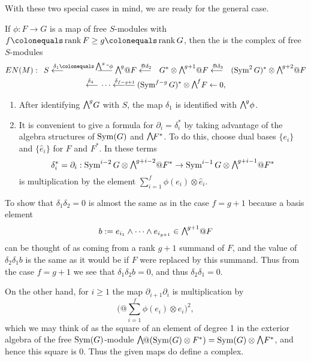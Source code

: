 With these two special cases in mind, we are ready for the general
case. 

\begin{definition}
If $\phi: F\to G$ is a map of free $S$-modules with 
$f\colonequals \rank F\geq  g\colonequals  \rank G$, then the
%
is the complex of free $S$-modules
\begin{multline*}
EN(M): \quad
S \luto{\delta_1\colonequals \ssty\bigwedge^g``\phi}\hskip-30pt-\hskip-4pt-\hskip-4pt-
\hskip3pt
\mwedge^g @F
\luto{@\delta_{2}}
G^*\otimes \mwedge^{g+1}@ F  \luto{@\delta_{3}}
(\Sym^2G)^*\otimes\mwedge^{g+2}@F  \\
\luto{\delta_{4}}\cdots\luto{\delta_{f-g+1}}\hskip-23pt-\hskip-4pt-
(\Sym^{f-g}G)^*\otimes\mwedge^fF
\leftarrow 0,
\end{multline*}
\begin{enumerate}

\item After identifying $\mwedge^{g}G$ with $S$, the map $\delta_{1}$
is identified with $\mwedge^{g}\phi$.

\item It is convenient to give a formula for $\partial_{i} =
\delta_{i}^{*}$ by taking advantage of the
algebra structures of $\operatorname{Sym}(G)$ and $\mwedge F^{*}$. To do this, choose
dual bases $\{e_{i}\}$ and $\{\hat e_{i}\}$ for $F$ and $F^{*}$. In
these terms
$$
\delta_{i}^{*} = \partial_{i}:
\Sym^{i-2}G \otimes \mwedge^{g+i-2}@F^{*} \to
\Sym^{i-1}G \otimes \mwedge^{g+i-1}@F^{*}
$$
is multiplication by the element
$\sum_{i = 1}^{f} \phi(e_{i}) \otimes \hat e_{i}$.
\end{enumerate}

To show that $\delta_{1}\delta_{2} = 0$ is almost the same as in the
case $f = g+1$ because
a basis element
$$
b: = e_{i_{1}}\wedge \cdots \wedge e_{i_{g+1}} \in \mwedge^{g+1}@F
$$
can be thought of as coming from a rank $g+1$ summand of $F$, and the
value of $\delta_{2}\delta_{1}b$
is the same as it would be if $F$ were replaced by this summand. Thus
from the case $f=g+1$ we see
that $\delta_{1}\delta_{2}b = 0$, and thus $\delta_{2}\delta_{1} = 0$.

On the other hand, for $i\geq 1$ the map $\partial_{i+1}\partial_{i}$
is multiplication by
$$
\biggl(@\sum_{i = 1}^{f} \phi(e_{i}) \otimes \hat e_{i}\biggr)^{\!2},
$$
which we may think of as the square of an element of degree 1 in the
exterior algebra
of the free $\operatorname{Sym}(G)$-module $\mwedge@(\Sym(G)\otimes F^{*}) = \Sym(G)
\otimes \mwedge \,F^{*}$, and hence this square is 0.
Thus the given maps do define a complex.
\end{definition}

